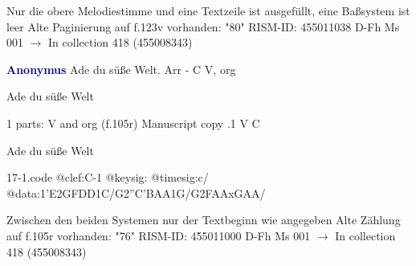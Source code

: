 \documentclass[twocolumn]{book}
\begin{document}
\newline Nur die obere Melodiestimme und eine Textzeile ist ausgefüllt, eine Baßsystem ist leer
\newline Alte Paginierung auf f.123v vorhanden: "80"
\newline RISM-ID: 455011038
\newline D-Fh  Ms 001
\newline $\rightarrow$ In collection 418 (455008343)
      
\newline \par \vspace{7pt} \textcolor{darkblue}{\textbf{Anonymus  }}
\newline Ade du süße Welt. Arr - C
\newline V, org
\newline \begin{itshape} Ade du süße Welt\end{itshape} 
\newline \textcolor{darkblue}{}  1 parts: V and org  (f.105r)
\newline Manuscript copy
.1  V  C
\newline \begin{footnotesize} Ade du süße Welt \end{footnotesize}  
\begin{filecontents*}{17-1.code}
@clef:C-1
@keysig:
@timesig:c/
@data:1'E2GFDD1C/G2''C'BAA1G/G2FAAxGAA/
\end{filecontents*}
\newline
%

\newline Zwischen den beiden Systemen nur der Textbeginn wie angegeben
\newline Alte Zählung auf f.105r vorhanden: "76"
\newline RISM-ID: 455011000
\newline D-Fh  Ms 001
\newline $\rightarrow$ In collection 418 (455008343)
      
\end{document}
